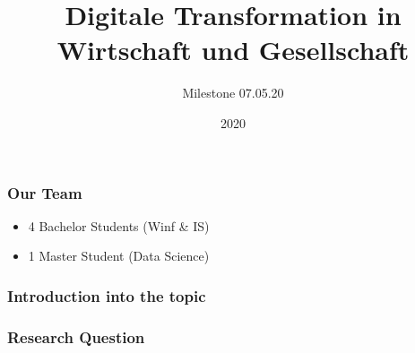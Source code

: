 \documentclass{beamer}
\title{Digitale Transformation in Wirtschaft und Gesellschaft}
\author{Milestone 07.05.20}
\institute{University of Bamberg/ University Konstanz}
\date{2020}
\begin{document}
\frame{\titlepage}

\begin{frame}
\frametitle{Our Team}

\begin{itemize}
	\item 4 Bachelor Students (Winf \& IS) 
	\item 1 Master Student  (Data Science)
\end{itemize}




\end{frame}


\begin{frame}
\frametitle{Introduction into the topic}
	
\end{frame}	


\begin{frame}
\frametitle{Research Question}
	
\end{frame}	
\end{document}
